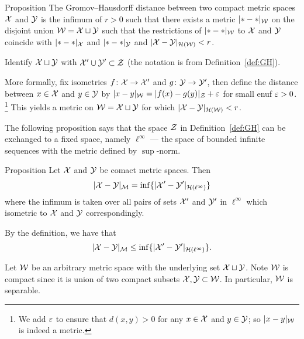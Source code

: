 \begin{thm}{Proposition}\label{prop:GH=X+Y}
The Gromov--Hausdorff distance between two compact metric spaces $\mathcal{X}$
and $\mathcal{Y}$ is the infimum of $r > 0$ such that there exists a metric
$|{*}-{*}|_{\mathcal{W}}$ on the disjoint union $\mathcal{W}=\mathcal{X}\sqcup \mathcal{Y}$ 
such that the restrictions of $|{*}-{*}|_{\mathcal{W}}$ to $\mathcal{X}$ and $\mathcal{Y}$
coincide with $|{*}-{*}|_{\mathcal{X}}$ and $|{*}-{*}|_{\mathcal{Y}}$ 
and $|\mathcal{X}-\mathcal{Y}|_{\mathcal{H}(\mathcal{W})} < r$. 
\end{thm}


Identify $\mathcal{X}\sqcup \mathcal{Y}$ with $\mathcal{X}'\cup \mathcal{Y}' \subset \mathcal{Z}$ 
(the notation
is from Definition~\ref{def:GH}). 

More formally, fix isometries $f\colon \mathcal{X} \to \mathcal{X}'$ and
$g\colon \mathcal{Y} \to \mathcal{Y}'$, then define the distance between $x \in \mathcal{X}$ and $y \in \mathcal{Y}$ by
$|x-y|_{\mathcal{W}} = |f (x)- g(y)|_{\mathcal{Z}}+\varepsilon$ for small enuf $\varepsilon>0$.%
\footnote{We add $\varepsilon$ to ensure that $d(x, y) > 0$ for any $x\in \mathcal{X}$ and $y\in \mathcal{Y}$;
so $|x-y|_{\mathcal{W}}$ is indeed a metric.}
This yields a metric on $\mathcal{W}=\mathcal{X}\sqcup \mathcal{Y}$ for which
$|\spc{X}- \spc{Y}|_{\mathcal{H}(\spc{W})} \z< r$.
\qeds

The following proposition says that the space $\mathcal{Z}$ in Definition~\ref{def:GH} can be exchanged to a fixed space, namely $\ell^\infty$ --- the space of bounded infinite sequences with the metric defined by $\sup$-norm.

\begin{thm}{Proposition}\label{prop:GH-with-fixed-Z}
Let $\mathcal{X}$ and $\mathcal{Y}$ be comact metric spaces.
Then
$$|\mathcal{X}-\mathcal{Y}|_{\mathcal{M}} = \inf \{|\mathcal{X}'-\mathcal{Y}'|_{\mathcal{H}(\ell^\infty)}\}$$ 
where the infimum is taken over all pairs of sets $\mathcal{X}'$ and $\mathcal{Y}'$ in $\ell^\infty$
which isometric to  $\mathcal{X}$ and $\mathcal{Y}$ correspondingly.  
\end{thm}




By the definition, we have that 
\[|\mathcal{X}-\mathcal{Y}|_{\mathcal{M}} \leq \inf \{|\mathcal{X}'-\mathcal{Y}'|_{\mathcal{H}(\ell^\infty)}\}.\]

Let $\mathcal{W}$ be an arbitrary metric space with the underlying set $\mathcal{X}\sqcup \mathcal{Y}$.
Note $\mathcal{W}$ is compact since it is union of two compact subsets $\mathcal{X},\mathcal{Y}\subset \mathcal{W}$.
In particular, $\mathcal{W}$ is separable.

